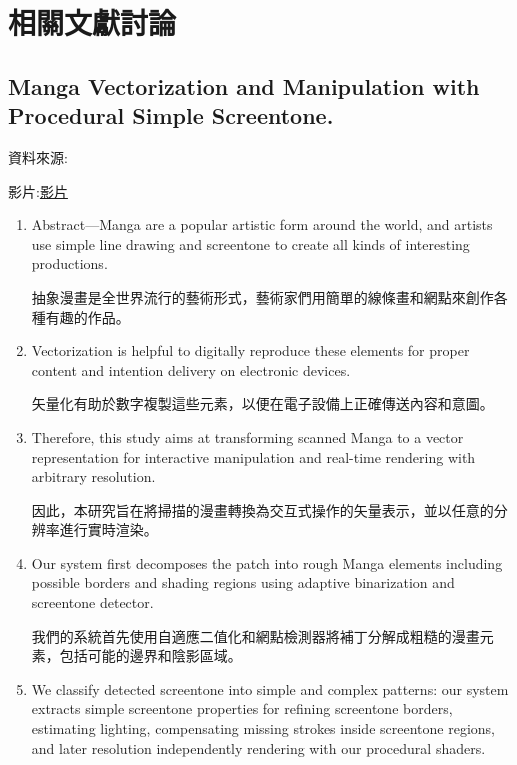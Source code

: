 \chapter{相關文獻討論}
\label{c:2}

\section{Manga Vectorization and Manipulation with Procedural Simple Screentone.}
資料來源:\cite{7399427}\par
影片:\href{video.mp4}{影片}
       
\begin{enumerate}
\item Abstract—Manga are a popular artistic form around the world, and artists use simple line drawing and screentone to create all kinds of interesting productions.

抽象漫畫是全世界流行的藝術形式，藝術家們用簡單的線條畫和網點來創作各種有趣的作品。


\item Vectorization is helpful to digitally reproduce these elements for proper content and intention delivery on electronic devices. 

矢量化有助於數字複製這些元素，以便在電子設備上正確傳送內容和意圖。


\item Therefore, this study aims at transforming scanned Manga to a vector representation for interactive manipulation and real-time rendering with arbitrary resolution.

因此，本研究旨在將掃描的漫畫轉換為交互式操作的矢量表示，並以任意的分辨率進行實時渲染。


\item Our system first decomposes the patch into rough Manga elements including possible borders and shading regions using adaptive binarization and screentone detector.

我們的系統首先使用自適應二值化和網點檢測器將補丁分解成粗糙的漫畫元素，包括可能的邊界和陰影區域。


\item We classify detected screentone into simple and complex patterns: our system extracts simple screentone properties for refining screentone borders, estimating lighting, compensating missing strokes inside screentone regions, and later resolution independently rendering with our procedural shaders.


\end{enumerate}
